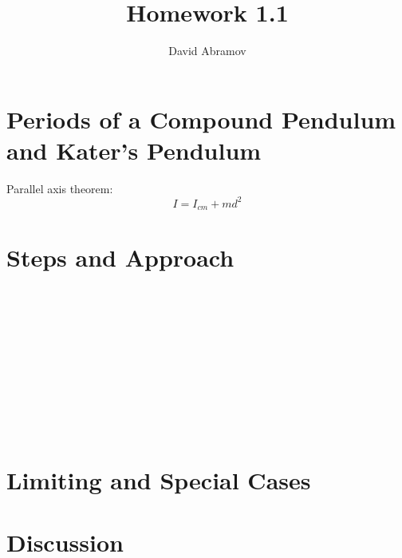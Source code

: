 \documentclass[11pt, oneside]{article}   	%
\title{Homework 1.1}
\author{David Abramov}
\begin{document}
\maketitle
\section{Periods of a Compound Pendulum and Kater's Pendulum}

Parallel axis theorem:
\begin{equation}
I = I_{cm} + md^2
\end{equation}

\section{Steps and Approach}


\begin{equation}
\end{equation}

\noindent

\begin{equation}
\end{equation}


\begin{equation}
\end{equation}


\begin{equation}
\end{equation}

\begin{equation}
\end{equation}

\begin{equation}
\end{equation}


\begin{equation}
\end{equation}

\begin{equation}
\end{equation}


\begin{equation}
\end{equation}


\begin{equation}
\end{equation}


\begin{equation}
\end{equation}


\begin{equation}
\end{equation}

\begin{equation}
\end{equation}


\begin{equation}
\end{equation}

\section{Limiting and Special Cases}



\section{Discussion}
\end{document}
